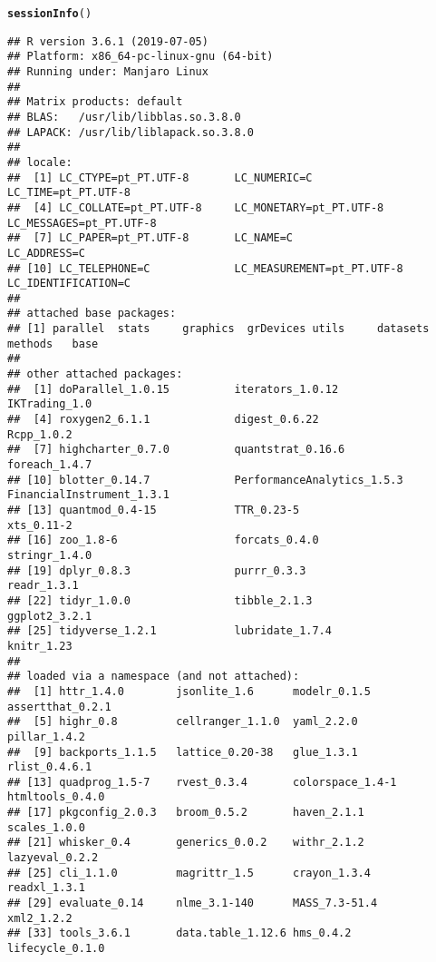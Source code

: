 \documentclass{article}\usepackage[]{graphicx}\usepackage[]{color}
\makeatletter
\newcommand{\hlstd}[1]{\textcolor[rgb]{0.345,0.345,0.345}{#1}}%
\newcommand{\hlkwd}[1]{\textcolor[rgb]{0.737,0.353,0.396}{\textbf{#1}}}%
\newenvironment{kframe}{%
 \def\at@end@of@kframe{}%
 \ifinner\ifhmode%
  \def\at@end@of@kframe{\end{minipage}}%
  \begin{minipage}{\columnwidth}%
 \fi\fi%
 \def\FrameCommand##1{\hskip\@totalleftmargin \hskip-\fboxsep
 \colorbox{shadecolor}{##1}\hskip-\fboxsep
     \hskip-\linewidth \hskip-\@totalleftmargin \hskip\columnwidth}%
 \MakeFramed {\advance\hsize-\width
   \@totalleftmargin\z@ \linewidth\hsize
   \@setminipage}}%
 {\par\unskip\endMakeFramed%
 \at@end@of@kframe}
\newenvironment{knitrout}{}{} %
\makeatother
\begin{document}
\begin{knitrout}
\color{fgcolor}\begin{kframe}
\begin{alltt}
\hlkwd{sessionInfo}\hlstd{()}
\end{alltt}
\begin{verbatim}
## R version 3.6.1 (2019-07-05)
## Platform: x86_64-pc-linux-gnu (64-bit)
## Running under: Manjaro Linux
## 
## Matrix products: default
## BLAS:   /usr/lib/libblas.so.3.8.0
## LAPACK: /usr/lib/liblapack.so.3.8.0
## 
## locale:
##  [1] LC_CTYPE=pt_PT.UTF-8       LC_NUMERIC=C               LC_TIME=pt_PT.UTF-8       
##  [4] LC_COLLATE=pt_PT.UTF-8     LC_MONETARY=pt_PT.UTF-8    LC_MESSAGES=pt_PT.UTF-8   
##  [7] LC_PAPER=pt_PT.UTF-8       LC_NAME=C                  LC_ADDRESS=C              
## [10] LC_TELEPHONE=C             LC_MEASUREMENT=pt_PT.UTF-8 LC_IDENTIFICATION=C       
## 
## attached base packages:
## [1] parallel  stats     graphics  grDevices utils     datasets  methods   base     
## 
## other attached packages:
##  [1] doParallel_1.0.15          iterators_1.0.12           IKTrading_1.0             
##  [4] roxygen2_6.1.1             digest_0.6.22              Rcpp_1.0.2                
##  [7] highcharter_0.7.0          quantstrat_0.16.6          foreach_1.4.7             
## [10] blotter_0.14.7             PerformanceAnalytics_1.5.3 FinancialInstrument_1.3.1 
## [13] quantmod_0.4-15            TTR_0.23-5                 xts_0.11-2                
## [16] zoo_1.8-6                  forcats_0.4.0              stringr_1.4.0             
## [19] dplyr_0.8.3                purrr_0.3.3                readr_1.3.1               
## [22] tidyr_1.0.0                tibble_2.1.3               ggplot2_3.2.1             
## [25] tidyverse_1.2.1            lubridate_1.7.4            knitr_1.23                
## 
## loaded via a namespace (and not attached):
##  [1] httr_1.4.0        jsonlite_1.6      modelr_0.1.5      assertthat_0.2.1 
##  [5] highr_0.8         cellranger_1.1.0  yaml_2.2.0        pillar_1.4.2     
##  [9] backports_1.1.5   lattice_0.20-38   glue_1.3.1        rlist_0.4.6.1    
## [13] quadprog_1.5-7    rvest_0.3.4       colorspace_1.4-1  htmltools_0.4.0  
## [17] pkgconfig_2.0.3   broom_0.5.2       haven_2.1.1       scales_1.0.0     
## [21] whisker_0.4       generics_0.0.2    withr_2.1.2       lazyeval_0.2.2   
## [25] cli_1.1.0         magrittr_1.5      crayon_1.3.4      readxl_1.3.1     
## [29] evaluate_0.14     nlme_3.1-140      MASS_7.3-51.4     xml2_1.2.2       
## [33] tools_3.6.1       data.table_1.12.6 hms_0.4.2         lifecycle_0.1.0  

\end{verbatim}
\end{kframe}
\end{knitrout}
\end{document}
